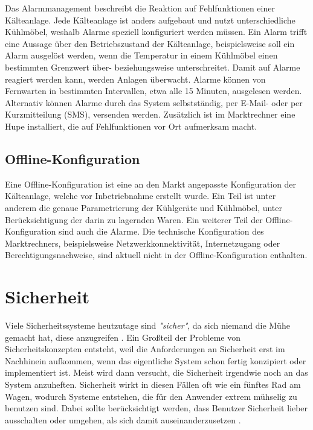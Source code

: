 \documentclass[11pt,a4paper]{report}
\begin{document}
Das Alarmmanagement beschreibt die Reaktion auf Fehlfunktionen einer Kälteanlage. Jede Kälteanlage ist anders aufgebaut und nutzt unterschiedliche Kühlmöbel, weshalb Alarme speziell konfiguriert werden müssen. Ein Alarm trifft eine Aussage über den Betriebszustand der Kälteanlage, beispielsweise soll ein Alarm ausgelöst werden, wenn die Temperatur in einem Kühlmöbel einen bestimmten Grenzwert über- beziehungsweise unterschreitet. Damit auf Alarme reagiert werden kann, werden Anlagen überwacht. Alarme können von Fernwarten in bestimmten Intervallen, etwa alle 15 Minuten, ausgelesen werden. Alternativ können Alarme durch das System selbstständig, per E-Mail- oder per Kurzmitteilung (SMS), versenden werden. Zusätzlich ist im Marktrechner eine Hupe installiert, die auf Fehlfunktionen vor Ort aufmerksam macht. 

\subsection{Offline-Konfiguration} 

Eine Offline-Konfiguration ist eine an den Markt angepasste Konfiguration der Kälteanlage, welche vor Inbetriebnahme erstellt wurde. Ein Teil ist unter anderem die genaue Parametrierung der Kühlgeräte und Kühlmöbel, unter Berücksichtigung der darin zu lagernden Waren. Ein weiterer Teil der Offline-Konfiguration sind auch die Alarme. Die technische Konfiguration des Marktrechners, beispielsweise Netzwerkkonnektivität, Internetzugang oder Berechtigungsnachweise, sind aktuell nicht in der Offline-Konfiguration enthalten.

\section{Sicherheit} \label{sec:security_conzept}

Viele Sicherheitssysteme heutzutage sind \textit{"sicher"}, da sich niemand die Mühe gemacht hat, diese anzugreifen \cite[s.~0]{gutmann}. Ein Großteil der Probleme von Sicherheitskonzepten entsteht, weil die Anforderungen an Sicherheit erst im Nachhinein aufkommen, wenn das eigentliche System schon fertig konzipiert oder implementiert ist. Meist wird dann versucht, die Sicherheit irgendwie noch an das System anzuheften. Sicherheit wirkt in diesen Fällen oft wie ein fünftes Rad am Wagen, wodurch Systeme entstehen, die für den Anwender extrem mühselig zu benutzen sind. Dabei sollte berücksichtigt werden, dass Benutzer Sicherheit lieber ausschalten oder umgehen, als sich damit auseinanderzusetzen \cite[s.~5]{gutmann}. 
\end{document}
